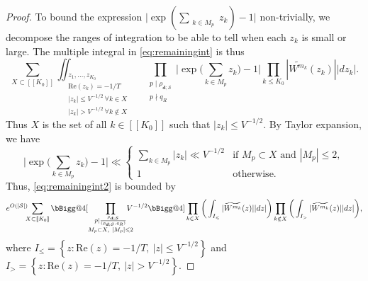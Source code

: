 \documentclass[11pt]{amsart}
\makeatletter
\theoremstyle{definition}
\renewcommand{\leq}{\leqslant}
\renewcommand{\Re}{\mathrm{Re}}
\newcommand{\sinterval}[1]{[\![#1]\!] }
\renewcommand{\d}{\boldsymbol{d}}
\newcommand{\curlyL}{V}
\newcommand{\fprod}[1]{\rho_{#1}}
\newcommand{\s}{\mathcal{S}}
\newcommand{\modulus}{q}
\newcommand{\insingleproof}{M}
\newcommand{\xinsingleproof}{X}
\newcommand{\otherL}{T}
\newcommand{\littleh}{k}
\newcommand{\Vast}{\bBigg@{4}}
\makeatother
\begin{document}
\begin{proof}
To bound the expression $\lvert\exp (\sum_{\substack{\littleh \in \insingleproof_p} }z_{\littleh})-1\rvert$ non-trivially, we decompose the ranges of integration to be able to tell when each $z_k$ is small or large. The multiple integral in \cref{eq:remainingint} is thus
\begin{equation}
\label{eq:remainingint2}
\sum_{\xinsingleproof \subset \sinterval{K_0}}  \iint_{\substack{\\ z_1,\dots,z_{K_0} \,\,\,\,\,\, \,\,\,\,\,\,\,\,\,  \,\,\,\,\,\,\,\,\, \\ \Re(z_{\littleh})=-1/\otherL \qquad \\ \!\!\!\! |z_{\littleh}|\leq \curlyL^{-1/2}\, \forall \littleh \in \xinsingleproof\\ \!\!\!\! |z_{\littleh}|> \curlyL^{-1/2}\, \forall \littleh \notin \xinsingleproof}} \prod_{\substack{p\mid \fprod{\d; \s}\\ p\nmid \modulus_R}} \Bigg|\exp \bigg(\sum_{\littleh \in \insingleproof_p} z_{\littleh}\bigg)-1\Bigg|   \prod_{\littleh \leq K_0} |\widetilde{W^{m_{\littleh}}}(z_{\littleh}) |  |dz_{\littleh}|.
\end{equation}
Thus $\xinsingleproof$ is the set of all $k\in \sinterval{K_0}$ such that $|z_k| \leq \curlyL^{-1/2}$. By Taylor expansion, we have
\begin{equation*}
\Bigg|\exp \bigg(\sum_{\littleh \in \insingleproof_p} z_{\littleh} \bigg)-1\Bigg| \ll \begin{cases}
 \sum_{\littleh \in \insingleproof_p} |z_{\littleh}| \ll \curlyL^{-1/2} &\text{if }\insingleproof_p\subset \xinsingleproof\text{ and }|\insingleproof_p| \leq 2,\\
 1 &\text{otherwise.}
\end{cases}
\end{equation*}
Thus, \cref{eq:remainingint2} is bounded by
\begin{equation}
\label{eq:laplace3}
e^{O(|\s|)}\!\!\!\sum_{\substack{\xinsingleproof \subset \sinterval{K_0} }} \Vast[\prod_{\substack{p \mid \frac{\fprod{\d; \s}}{(\fprod{\d; \s}, \modulus_R)}\\ \insingleproof_p\subset \xinsingleproof,\  |\insingleproof_p|\leq 2}}\!\!\!\!\!\!  \curlyL^{-1/2} \Vast] \prod_{\littleh \in \xinsingleproof}\bigg(\int_{I_{\leq}} |\widetilde{W^{m_{\littleh}}}(z)| |dz|\bigg)\prod_{\littleh \notin \xinsingleproof} \bigg(\int_{I_>} |\widetilde{W^{m_{\littleh}}}(z)| |dz|\bigg),
\end{equation}
where $I_{\leq} = \left\{z: \Re(z)=-1/\otherL,\ |z|\leq  \curlyL^{-1/2}\right\}$ and $I_{>} =\left\{z: \Re(z)=-1/\otherL,\ |z|>  \curlyL^{-1/2}\right\}$.


\end{proof}
\end{document}

